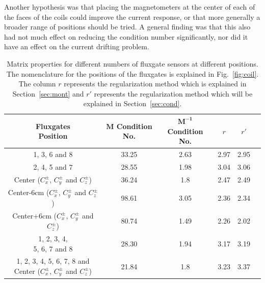 Another hypothesis was that placing the magnetometers at the center of
each of the faces of the coils could improve the current response, or
that more generally a broader range of positions should be tried.  A
general finding was that this also had not much effect on reducing the
condition number significantly, nor did it have an effect on the
current drifting problem.

\begin{table}%
    \centering
    \begin{tabular} { |c|c|c|c|c|c|} 
        \hline
        \makecell{Fluxgates \\Position} & \makecell{$\bm{M}$\\ Condition No.} &\makecell{$\bm{M^{-1}}$\\ Condition No.} & $r$ & $r'$\\
        \hline\hline
        1, 3, 6 and 8 & 33.25 & 2.63 & 2.97 & 2.95\\ 
        \hline
        2, 4, 5 and 7 & 28.55 & 1.98 & 3.04 & 3.06 \\ 
        \hline
        \makecell{Center \\($C_x^\pm$, $C_y^\pm$ and $C_z^\pm$)} & 36.24 & 1.8 & 2.47 & 2.49 \\ 
        \hline
        \makecell{Center-6cm \\($C_x^\pm$, $C_y^\pm$ and $C_z^\pm$)} & 98.61 & 3.05 & 2.36 & 2.34 \\ 
        \hline
        \makecell{Center+6cm \\($C_x^\pm$, $C_y^\pm$ and $C_z^\pm$)} & 80.74 & 1.49 & 2.26 & 2.02 \\ 
        \hline
        \makecell{1, 2, 3, 4, \\5, 6, 7 and 8} & 28.30 & 1.94 & 3.17 & 3.19 \\ 
        \hline
        \makecell{1, 2, 3, 4, \\5, 6, 7, 8 and \\Center ($C_x^\pm$, $C_y^\pm$ and $C_z^\pm$)}  & 21.84 & 1.8 & 3.23 & 3.37 \\ 
        \hline

    \end{tabular}\caption[Matrix properties for different numbers of
   fluxgate sensors at different positions.]{Matrix properties for
   different numbers of fluxgate sensors at different positions.  The
   nomenclature for the positions of the fluxgates is explained in
   Fig.~\ref{fig:coil}.  The column $r$ represents the regularization
   method which is explained in Section~\ref{sec:mont} and $r'$
   represents the regularization method which will be explained in
   Section~\ref{sec:cond}.}\label{table:flux-pos}
\end{table}

